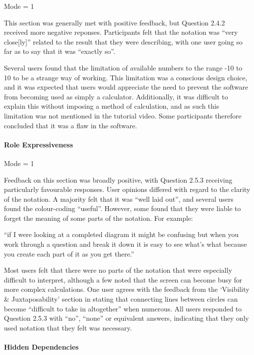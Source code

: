 \documentclass[12pt,twoside,notitlepage,xetex]{report}
\begin{document}
Mode = 1

This section was generally met with positive feedback, but Question 2.4.2 received more negative reponses.  Participants felt that the notation was ``very close[ly]'' related to the result that they were describing, with one user going so far as to say that it was ``exactly so''.

Several users found that the limitation of available numbers to the range -10 to 10 to be a strange way of working.  This limitation was a conscious design choice, and it was expected that users would appreciate the need to prevent the software from becoming used as simply a calculator.  Additionally, it was difficult to explain this without imposing a method of calculation, and as such this limitation was not mentioned in the tutorial video.  Some participants therefore concluded that it was a flaw in the software.

\paragraph{Role Expressiveness}\hfill

Mode = 1

Feedback on this section was broadly positive, with Question 2.5.3 receiving particularly favourable responses.  User opinions differed with regard to the clarity of the notation.  A majority felt that it was ``well laid out'', and several users found the colour-coding ``useful''.  However, some found that they were liable to forget the meaning of some parts of the notation.  For example:
\begin{center}
\parbox[c]{\textwidth-2cm}{
\small
``if I were looking at a completed diagram it might be confusing but when you work through a question and break it down it is easy to see what's what because you create each part of it as you get there.''
}
\end{center}

Most users felt that there were no parts of the notation that were especially difficult to interpret, although a few noted that the screen can become busy for more complex calculations.  One user agrees with the feedback from the `Visibility \& Juxtaposability' section in stating that connecting lines between circles can become ``difficult to take in altogether'' when numerous.  All users responded to Question 2.5.3 with ``no'', ``none'' or equivalent answers, indicating that they only used notation that they felt was necessary.

\paragraph{Hidden Dependencies}\hfill
\end{document}
